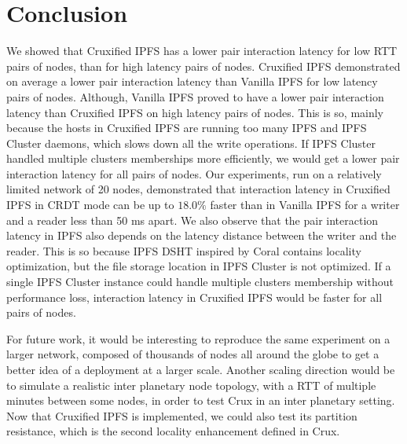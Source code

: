 \documentclass[a4paper,11pt,oneside]{report}
\begin{document}
\chapter{Conclusion}

We showed that Cruxified IPFS has a lower pair interaction latency for low RTT pairs of nodes, than for high latency pairs of nodes. Cruxified IPFS demonstrated on average a lower pair interaction latency than Vanilla IPFS for low latency pairs of nodes. Although, Vanilla IPFS proved to have a lower pair interaction latency than Cruxified IPFS on high latency pairs of nodes. This is so, mainly because the hosts in Cruxified IPFS are running too many IPFS and IPFS Cluster daemons, which slows down all the write operations. If IPFS Cluster handled multiple clusters memberships more efficiently, we would get a lower pair interaction latency for all pairs of nodes. Our experiments, run on a relatively limited network of 20 nodes, demonstrated that interaction latency in Cruxified IPFS in CRDT mode can be up to $18.0\%$ faster than in Vanilla IPFS for a writer and a reader less than 50 ms apart. 
We also observe that the pair interaction latency in IPFS also depends on the latency distance between the writer and the reader. This is so because IPFS DSHT inspired by Coral contains locality optimization, but the file storage location in IPFS Cluster is not optimized. If a single IPFS Cluster instance could handle multiple clusters membership without performance loss, interaction latency in Cruxified IPFS would be faster for all pairs of nodes.

For future work, it would be interesting to reproduce the same experiment on a larger network, composed of thousands of nodes all around the globe to get a better idea of a deployment at a larger scale. Another scaling direction would be to simulate a realistic inter planetary node topology, with a RTT of multiple minutes between some nodes, in order to test Crux in an inter planetary setting. Now that Cruxified IPFS is implemented, we could also test its partition resistance, which is the second locality enhancement defined in Crux.

\printbibliography
\end{document}
